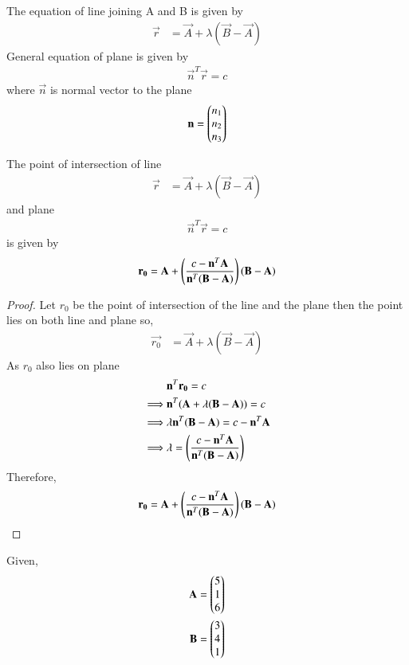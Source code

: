 The equation of line joining A and B is given by 
\begin{align}
    \vec{r} &= \vec{A}+\lambda(\vec{B}-\vec{A})   
\end{align}
General equation of plane is given by
\begin{align}
    \vec{n}^T\vec{r} = c
\end{align}
where $\vec{n}$ is normal vector to the plane 
\begin{align}
    \mathbf{n} = \begin{pmatrix}n_1\\n_2\\n_3\end{pmatrix}
\end{align}
\begin{lemma}
    The point of intersection of line
    \begin{align}
        \vec{r} &= \vec{A}+\lambda(\vec{B}-\vec{A})
    \end{align}
    and plane
    \begin{align}
        \vec{n}^T\vec{r} = c  
    \end{align}
    is given by
    \begin{align}
        \mathbf{r_0} = \mathbf{A}+\left(\frac{c-\mathbf{n}^T\mathbf{A}}{\mathbf{n}^T(\mathbf{B}-\mathbf{A})}\right)(\mathbf{B}-\mathbf{A})
    \end{align}
\end{lemma}
\begin{proof}
Let $r_0$ be the point of intersection of the line and the plane then the point lies on both line and plane so,
\begin{align}
    \vec{r_0} &= \vec{A}+\lambda(\vec{B}-\vec{A})  
\end{align}
As $r_0$ also lies on plane
\begin{align}
    &\mathbf{n}^T\mathbf{r_0} = c\\
    \implies &\mathbf{n}^T(\mathbf{A}+\lambda(\mathbf{B}-\mathbf{A})) = c\\
    \implies &\lambda\mathbf{n}^T(\mathbf{B}-\mathbf{A}) = c-\mathbf{n}^T\mathbf{A}\\
    \implies &\lambda = \left(\frac{c-\mathbf{n}^T\mathbf{A}}{\mathbf{n}^T(\mathbf{B}-\mathbf{A})}\right)
\end{align}
Therefore,
\begin{align}
    \mathbf{r_0} = \mathbf{A}+\left(\frac{c-\mathbf{n}^T\mathbf{A}}{\mathbf{n}^T(\mathbf{B}-\mathbf{A})}\right)(\mathbf{B}-\mathbf{A})
\end{align}
\end{proof}
Given,
\begin{align}
    \mathbf{A} = \begin{pmatrix}5\\1\\6\end{pmatrix}\\
    \mathbf{B} = \begin{pmatrix}3\\4\\1\end{pmatrix}
\end{align}
